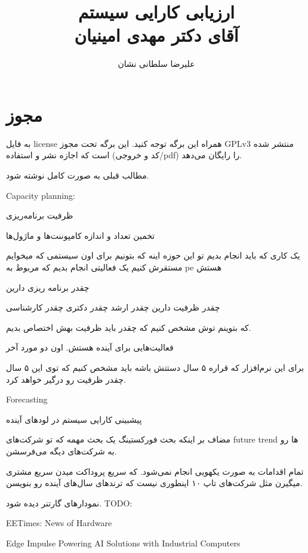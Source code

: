 \documentclass[a4paper]{article}
\title{ارزیابی کارایی سیستم \\ آقای دکتر مهدی امینیان}
\author{علیرضا سلطانی نشان}
\begin{document}
\maketitle
\tableofcontents

\section*{مجوز}

به فایل license همراه این برگه توجه کنید. این برگه تحت مجوز GPLv3 منتشر شده است
که اجازه نشر و استفاده (کد و خروجی/pdf) را رایگان می‌دهد.


مطالب قبلی به صورت کامل نوشته شود.

Capacity planning:

ظرفیت برنامه‌ریزی 

تخمین تعداد و اندازه کامپوننت‌ها و ماژول‌ها

یک کاری که باید انجام بدیم تو این حوزه اینه که بتونیم برای اون سیستمی که میخوایم
مستقرش کنیم یک فعالیتی انجام بدیم که مربوط به pe هستش 

چقدر برنامه ریزی دارین

چقدر ظرفیت دارین چقدر ارشد چقدر دکتری چقدر کارشناسی

که بتوینم توش مشخص کنیم که چقدر باید ظرفیت بهش اختصاص بدیم.

فعالیت‌هایی برای آینده هستش. اون دو مورد آخر

برای این نرم‌افزار که قراره ۵ سال دستتش باشه باید مشخص کنیم که توی این ۵ سال
چقدر ظرفیت رو درگیر خواهد کرد.

Forecasting

پیشبینی کارایی سیستم در لود‌های آینده

مضاف بر اینکه بحث فورکستینگ یک بحث مهمه که تو شرکت‌های future trend ها رو به
شرکت‌های دیگه می‌فرسشن.

تمام اقدامات به صورت یکهویی انجام نمی‌شود. که سریع پروداکت میدن سریع مشتری
میگیرن مثل شرکت‌های تاپ ۱۰ اینطوری نیست که ترند‌های سال‌های آینده رو بنویسن.

نمودار‌های گارتنر دیده شود. TODO:

EETimes: News of Hardware

Edge Impulse Powering AI Solutions with Industrial Computers
\end{document}
